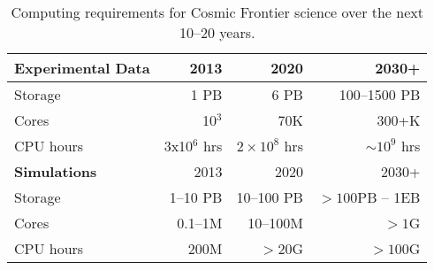 \begin{center}
\begin{table}
\caption{Computing requirements for Cosmic Frontier science over the next
 10--20 years.}
\begin{center}
\begin{tabular}{|l|r|r|r|} 
 \hline 
{\bf Experimental Data} & 2013 & 2020 & 2030+ \\
\hline
Storage & 1 PB & 6 PB & 100--1500 PB \\
Cores & 10$^3$ & 70K & 300+K \\
CPU hours & 3x10$^6$ hrs & $2\times 10^8$ hrs & $\sim 10^9$ hrs \\
 \hline 
{\bf Simulations} &2013 & 2020 & 2030+ \\
 \hline 
Storage & 1--10 PB & 10--100 PB & $> 100 $PB -- 1EB\\
Cores & 0.1--1M & 10--100M &$> 1$G\\
CPU hours & 200M & $>$20G & $> 100$G\\
\hline
\end{tabular}
\end{center}
\label{tab:CosmicCompNeeds}
\end{table}
\end{center}

